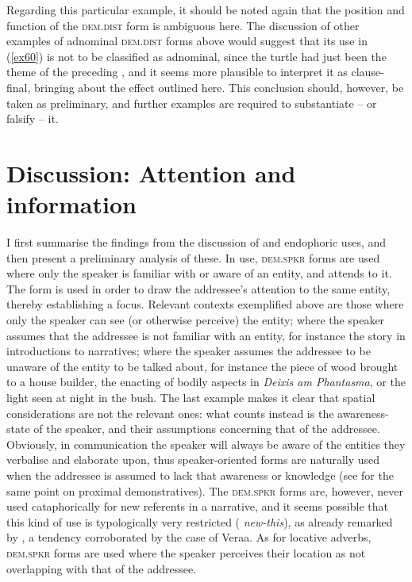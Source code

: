 \documentclass[output=paper
,modfonts
,nonflat]{langsci/langscibook}
\begin{document}
\noindent
Regarding this particular example, it should be noted again that the position and function of the \textsc{dem.dist} form is ambiguous here. The discussion  of other examples of adnominal \textsc{dem.dist} forms above would suggest that its use in (\ref{ex60}) is not to be classified as adnominal, since the turtle had just been the theme of the preceding , and it seems more plausible to interpret it as clause-final, bringing about the effect outlined here. This conclusion should, however, be taken as preliminary, and further examples are required to substantiate -- or falsify -- it. 


\section{Discussion: Attention and information}	\label{section4}
I first summarise the findings from the discussion of  and endophoric uses, and then present a preliminary analysis of these. In  use, \textsc{dem.spkr} forms are used where only the speaker is familiar with or aware of an entity, and attends to it. The form is used in order to draw the addressee's attention to the same entity, thereby establishing a  focus. Relevant contexts exemplified above are those where only the speaker can see (or otherwise perceive) the entity; where the speaker assumes that the addressee is not familiar with an entity, for instance the story in introductions to narratives; where the speaker assumes the addressee to be unaware of the entity to be talked about, for instance the piece of wood brought to a house builder, the enacting of bodily aspects in \textit{Deixis am Phantasma}, or the light seen at night in the bush. The last example makes it clear that spatial considerations are not the relevant ones: what counts instead is the awareness-state of the speaker, and their assumptions concerning that of the addressee. Obviously, in communication the speaker will always be aware of the entities they verbalise and elaborate upon, thus speaker-oriented forms are naturally used when the addressee is assumed to lack that awareness or knowledge (see \citealt{Mosel2004} for the same point on  proximal demonstratives). The \textsc{dem.spkr} forms are, however, never used cataphorically for new referents in a narrative, and it seems possible that this kind of use is typologically very restricted ( \textit{new-this}), as already remarked by \cite{Himmelmann1996}, a tendency corroborated by the case of Vera{\textquotesingle}a. As for locative adverbs, \textsc{dem.spkr} forms are used where the speaker perceives their location as not overlapping with that of the addressee.
\end{document}
